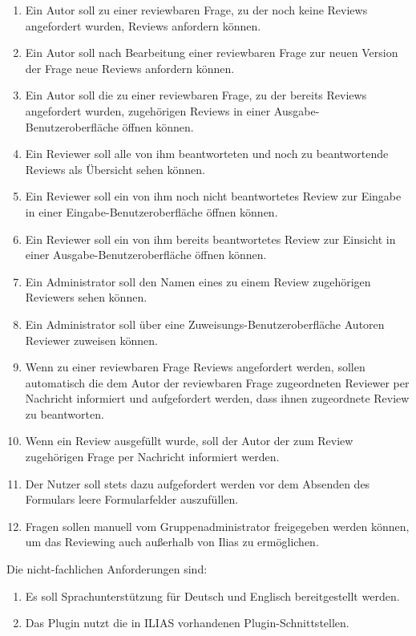 \documentclass[a4paper]{scrreprt}
\begin{document}
\begin{enumerate}[label= FA \arabic*:]
\item Ein Autor soll zu einer reviewbaren Frage, zu der noch keine Reviews angefordert wurden, Reviews anfordern können.
\item Ein Autor soll nach Bearbeitung einer reviewbaren Frage zur neuen Version der Frage neue Reviews  anfordern können.
\item Ein Autor soll die zu einer reviewbaren Frage, zu der bereits Reviews angefordert wurden, zugehörigen Reviews in einer Ausgabe-Benutzeroberfläche öffnen können.
\item Ein Reviewer soll alle von ihm beantworteten und noch zu beantwortende Reviews als Übersicht sehen können.
\item Ein Reviewer soll ein von ihm noch nicht beantwortetes Review zur Eingabe in einer Eingabe-Benutzeroberfläche öffnen können.
\item Ein Reviewer soll ein von ihm bereits beantwortetes Review zur Einsicht in einer Ausgabe-Benutzeroberfläche öffnen können.
\item Ein Administrator soll den Namen eines zu einem Review zugehörigen Reviewers sehen können.
\item Ein Administrator soll über eine Zuweisungs-Benutzeroberfläche Autoren Reviewer zuweisen können.
\item Wenn zu einer reviewbaren Frage Reviews angefordert werden, sollen automatisch die dem Autor der reviewbaren Frage zugeordneten Reviewer per Nachricht informiert und aufgefordert werden, dass ihnen zugeordnete Review zu beantworten.
\item Wenn ein Review ausgefüllt wurde, soll der Autor der zum Review zugehörigen Frage per Nachricht informiert werden.
\item Der Nutzer soll stets dazu aufgefordert werden vor dem Absenden des Formulars leere Formularfelder auszufüllen.  
\item Fragen sollen manuell vom Gruppenadministrator freigegeben werden können, um das Reviewing auch außerhalb von Ilias zu ermöglichen.
\end{enumerate}


Die nicht-fachlichen Anforderungen sind:
\begin{enumerate}[label=NFA \arabic*:]
\item Es soll Sprachunterstützung für Deutsch und Englisch bereitgestellt werden.
\item Das Plugin nutzt die in ILIAS vorhandenen Plugin-Schnittstellen.
\end{enumerate}
\end{document}
